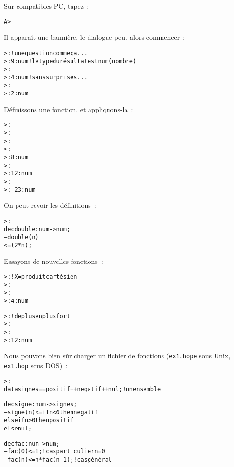 \begin{alltt}
% \tape{hope}
\end{alltt}
Sur compatibles PC, tapez :
\begin{alltt}
A> 
\end{alltt}
Il apparaît  une bannière, le dialogue peut alors commencer~:

\begin{alltt}
>:                          ! une question comme ça ...
>:  9 : num                     ! le type du résultat est num (nombre)
>: 
>:  4 : num                     ! sans surprises ...
>: 
>:  2 : num 
\end{alltt}

Définissons une fonction, et appliquons-la~:
\begin{alltt}
>:      
>: 
>:
>:                    
>:  8 : num
>: 
>:  12 : num
>: 
>:  -23 : num
\end{alltt}

On peut revoir les définitions~:
\begin{alltt}
>: 
dec double  : num  -> num  ;
--- double ( n )
       <=( 2 *  n ) ;
\end{alltt}

Essayons de nouvelles fonctions~:
\begin{alltt}
>:       ! X = produit cartésien
>: 
>: 
>:  4 : num

>: 	! de plus en plus fort
>: 
>: 
>:  12 : num
\end{alltt}

Nous pouvons bien sûr charger un fichier de fonctions (\verb+ex1.hope+ sous
Unix, \verb+ex1.hop+ sous DOS)~:
\begin{alltt}
>:                     
data signes == positif ++ negatif ++ nul;	! un ensemble

dec signe : num -> signes ;
--- signe (n) <=     if n<0 then negatif
                else if n>0 then positif
                            else nul;

dec fac : num -> num ;
--- fac (0) <= 1;                               ! cas particulier n=0
--- fac (n) <= n * fac(n - 1);                  ! cas général
\end{alltt}

